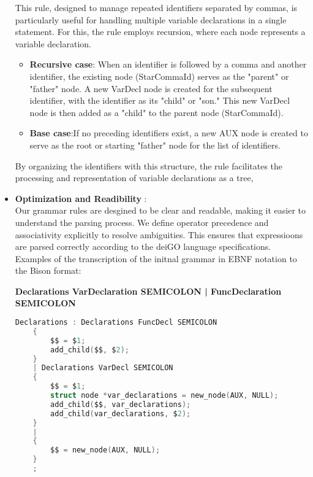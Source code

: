 \documentclass[12pt]{article}
\begin{document}
\begin{itemize}
            This rule, designed to manage repeated identifiers separated by commas, is particularly useful for handling multiple variable declarations in a single statement. For this, the rule employs recursion, where each node represents a variable declaration.   
            \begin{itemize}
                \item \textbf{Recursive case}:  When an identifier is followed by a comma and another identifier, the existing node (StarCommaId) serves as the "parent" or "father" node. A new VarDecl node is created for the subsequent identifier, with the identifier as its "child" or "son." This new VarDecl node is then added as a "child" to the parent node (StarCommaId).
                \item \textbf{Base case}:If no preceding identifiers exist, a new AUX node is created to serve as the root or starting "father" node for the list of identifiers.
            \end{itemize}
            By organizing the identifiers with this structure, the rule facilitates the processing and representation of variable declarations as a tree,
        \item \textbf{Optimization and Readibility }: \\ Our grammar rules are desgined to be clear and readable, making it easier to understand the parsing process. We define operator precedence and associativity explicitly to resolve ambiguities. This ensures that expressioons are parsed correctly according to the deiGO language specifications.
            \\Examples of the transcription of the initnal grammar in EBNF notation to the Bison format:
            \begin{center}
                \small\textbf{Declarations \textendash{} VarDeclaration SEMICOLON | FuncDeclaration SEMICOLON}
            \end{center}
            \begin{center}
                \begin{lstlisting}[language=C, basicstyle=\small\ttfamily]
Declarations : Declarations FuncDecl SEMICOLON
    {
        $$ = $1;
        add_child($$, $2);
    }              
    | Declarations VarDecl SEMICOLON
    {
        $$ = $1;
        struct node *var_declarations = new_node(AUX, NULL);
        add_child($$, var_declarations);
        add_child(var_declarations, $2);
    }
    | 
    {
        $$ = new_node(AUX, NULL);
    }
    ;
            \end{lstlisting}

\end{center}
\end{itemize}
\end{document}
